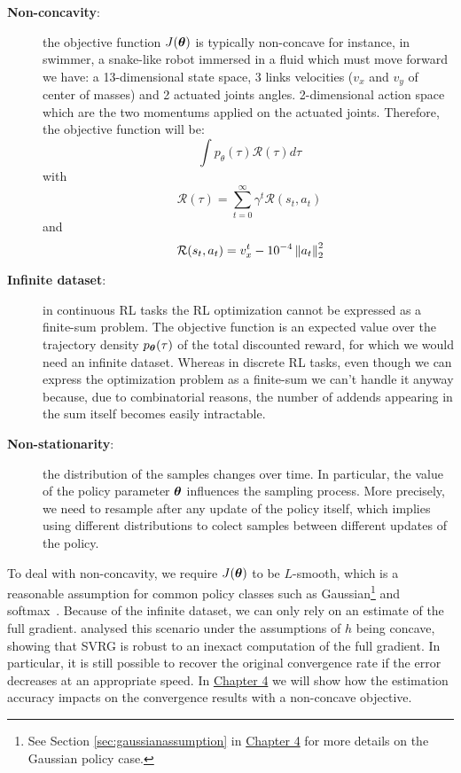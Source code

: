 \begin{description}
	\item[\textbf{\MakeUppercase{N}on-concavity}:] the objective function $J(\vtheta)$ is typically non-concave for instance, in swimmer, a snake-like robot immersed in a fluid which must move forward we have: a 13-dimensional state space, 3 links velocities ($v_x$ and $v_y$ of center of masses) and 2 actuated joints angles. 2-dimensional action space which are the two momentums applied on the actuated joints. Therefore, the objective function will be:
	\[
	\ \int p_{\theta}(\tau)\mathcal{R}(\tau)d\tau
	\]
	with 
	\[
	\ \mathcal{R}(\tau) = \sum_{t=0}^{\infty}\gamma^t\mathcal{R}(s_t,a_t)
	\]
	and 
	\[
	\ \mathcal{R}(s_t,a_t)=v^t_x - 10^{-4}\norm[2]{a_t}^2
	\]
	\item[\textbf{\MakeUppercase{I}nfinite dataset}:] in continuous \acs{RL} tasks the \acs{RL} optimization cannot be expressed as a finite-sum problem. The objective function is an expected value over the trajectory density $p_{\vtheta}(\tau)$ of the total discounted reward, for which we would need an infinite dataset. Whereas in discrete \acs{RL} tasks, even though we can express the optimization problem as a finite-sum we can't handle it anyway because, due to combinatorial reasons, the number of addends appearing in the sum itself becomes easily intractable.
	\item[\textbf{\MakeUppercase{N}on-stationarity}:] the distribution of the samples changes over time. In particular, the value of the policy parameter $\vtheta$ influences the sampling process. More precisely, we need to resample after any update of the policy itself, which implies using different distributions to colect samples between different updates of the policy.
\end{description}
To deal with non-concavity, we require $J(\vtheta)$ to be $L$-smooth, which is a reasonable assumption for common policy classes such as Gaussian\footnote{See Section \ref{sec:gaussianassumption} in \hyperref[chap:convergence]{Chapter 4} for more details on the Gaussian policy case.} and softmax~\citep[\eg][]{Furmston2012unifying,pirotta2015lipschitz}.
Because of the infinite dataset, we can only rely on an estimate of the full gradient.
\citet{harikandeh2015stopwasting} analysed this scenario under the assumptions of $h$ being concave, showing that \acs{SVRG} is robust to an inexact computation of the full gradient. In particular, it is still possible to recover the original convergence rate if the error decreases at an appropriate speed. In \hyperref[chap:convergence]{Chapter 4} we will show how the estimation accuracy impacts on the convergence results with a non-concave objective.

